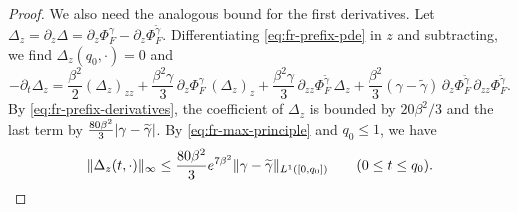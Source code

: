 \begin{proof}
We also need the analogous bound for the first derivatives. Let $\Delta_z=\partial_z\Delta=\partial_z\Phi^\gamma_F-\partial_z\Phi^{\widetilde\gamma}_F$. Differentiating \eqref{eq:fr-prefix-pde} in $z$ and subtracting, we find $\Delta_z(q_0,\cdot)=0$ and
\[
 -\partial_t\Delta_z=\frac{\beta^2}2(\Delta_z)_{zz}+\frac{\beta^2\gamma}3\,\partial_z\Phi^\gamma_F\,(\Delta_z)_z+\frac{\beta^2\gamma}3\,\partial_{zz}\Phi^{\widetilde\gamma}_F\,\Delta_z+\frac{\beta^2}3(\gamma-\widetilde\gamma)\,\partial_z\Phi^{\widetilde\gamma}_F\,\partial_{zz}\Phi^{\widetilde\gamma}_F.
\]
By \eqref{eq:fr-prefix-derivatives}, the coefficient of $\Delta_z$ is bounded by $20\beta^2/3$ and the last term by $\frac{80\beta^2}3\lvert \gamma-\widetilde\gamma\rvert$. By \eqref{eq:fr-max-principle} and $q_0\le1$, we have
\begin{equation}\label{eq:fr-gradient-stability}
 \lVert \Delta_z(t,\cdot)\rVert_\infty\le\frac{80\beta^2}3e^{7\beta^2}\lVert \gamma-\widetilde\gamma\rVert_{L^1([0,q_0])}\qquad(0\le t\le q_0).
\end{equation}


\end{proof}

